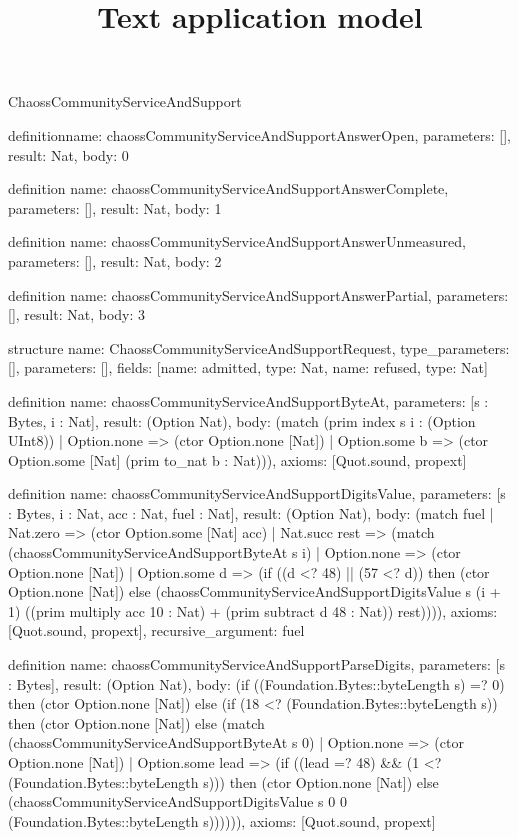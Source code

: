 \begin{lexlean}{ChaossCommunityServiceAndSupport}
\title{Text application model}
\begin{semanticmodule}
definition{name: chaossCommunityServiceAndSupportAnswerOpen, parameters: [], result: Nat, body: 0}

definition{
  name: chaossCommunityServiceAndSupportAnswerComplete,
  parameters: [],
  result: Nat,
  body: 1
}

definition{
  name: chaossCommunityServiceAndSupportAnswerUnmeasured,
  parameters: [],
  result: Nat,
  body: 2
}

definition{
  name: chaossCommunityServiceAndSupportAnswerPartial,
  parameters: [],
  result: Nat,
  body: 3
}

structure{
  name: ChaossCommunityServiceAndSupportRequest,
  type_parameters: [],
  parameters: [],
  fields: [{name: admitted, type: Nat}, {name: refused, type: Nat}]
}

definition{
  name: chaossCommunityServiceAndSupportByteAt,
  parameters: [s : Bytes, i : Nat],
  result: (Option Nat),
  body: (match (prim index s i : (Option UInt8))
    | Option.none => (ctor Option.none [Nat])
    | Option.some b => (ctor Option.some [Nat] (prim to_nat b : Nat))),
  axioms: [Quot.sound, propext]
}

definition{
  name: chaossCommunityServiceAndSupportDigitsValue,
  parameters: [s : Bytes, i : Nat, acc : Nat, fuel : Nat],
  result: (Option Nat),
  body: (match fuel
    | Nat.zero => (ctor Option.some [Nat] acc)
    | Nat.succ rest => (match (chaossCommunityServiceAndSupportByteAt s i)
      | Option.none => (ctor Option.none [Nat])
      | Option.some d => (if ((d <? 48) || (57 <? d)) then (ctor Option.none [Nat]) else (chaossCommunityServiceAndSupportDigitsValue s (i + 1) ((prim multiply acc 10 : Nat) + (prim subtract d 48 : Nat)) rest)))),
  axioms: [Quot.sound, propext],
  recursive_argument: fuel
}

definition{
  name: chaossCommunityServiceAndSupportParseDigits,
  parameters: [s : Bytes],
  result: (Option Nat),
  body: (if ((Foundation.Bytes::byteLength s) =? 0) then (ctor Option.none [Nat]) else (if (18 <? (Foundation.Bytes::byteLength s)) then (ctor Option.none [Nat]) else (match (chaossCommunityServiceAndSupportByteAt s 0)
    | Option.none => (ctor Option.none [Nat])
    | Option.some lead => (if ((lead =? 48) && (1 <? (Foundation.Bytes::byteLength s))) then (ctor Option.none [Nat]) else (chaossCommunityServiceAndSupportDigitsValue s 0 0 (Foundation.Bytes::byteLength s)))))),
  axioms: [Quot.sound, propext]
}


\end{semanticmodule}
\end{lexlean}
